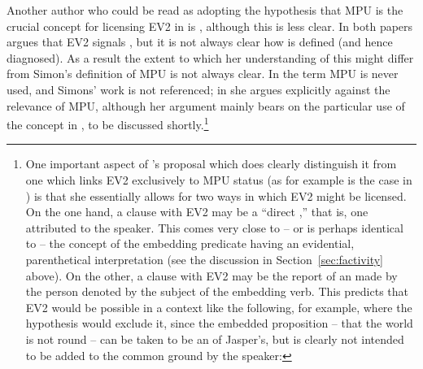 \documentclass[output=paper]{langsci/langscibook}
\begin{document}
Another author who could be read as adopting the hypothesis that MPU is the crucial concept for licensing EV2 in  is \citet{Julien2009,Julien2015}, 
although this is less clear. In both papers \citeauthor{Julien2009} argues that EV2 signals , but it is not always clear how  is defined (and hence diagnosed). As a result the extent to which her understanding of this might differ from Simon's definition of MPU is not always clear. In \cite{Julien2009} the term MPU is never used, and Simons' work is not referenced; in \cite{Julien2015} she argues explicitly against the relevance of MPU, although her argument mainly bears on the particular use of the concept in \cite{WiklundEtAl2009}, to be discussed shortly.\footnote{  
One important aspect of \citeauthor{Julien2009}'s proposal which does clearly distinguish it from one which links EV2 exclusively to MPU status (as for example is the case in \citealt{JensenChristensen2013}) is that she essentially allows for two ways in which EV2 might be licensed. On the one hand, a clause with EV2 may be a ``direct ,'' that is, one attributed to the speaker. This comes very close to -- or is perhaps identical to -- the concept of the embedding predicate having an evidential, parenthetical interpretation (see the discussion in Section~\ref{sec:factivity} above). On the other, a clause with EV2 may be the report of an  made by the {person} denoted by the subject of the embedding verb. This predicts that EV2 would be possible in a context like the following, for example, where the \citet{JensenChristensen2013} hypothesis would exclude it, since the embedded proposition -- that the world is not round -- can be taken to be an  of Jasper's, but is clearly not intended to be added to the common ground by the speaker:
}
\end{document}
